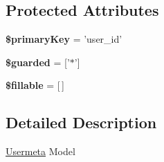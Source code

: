 \subsection*{Protected Attributes}
\begin{DoxyCompactItemize}
\item 
\hypertarget{classDMA_1_1Friends_1_1Models_1_1Usermeta_a664f37df5630b8a17b65b5d95192780b}{{\bfseries \$primary\+Key} = 'user\+\_\+id'}\label{classDMA_1_1Friends_1_1Models_1_1Usermeta_a664f37df5630b8a17b65b5d95192780b}

\item 
\hypertarget{classDMA_1_1Friends_1_1Models_1_1Usermeta_a95d74f02cd302db9566b8da29154e82d}{{\bfseries \$guarded} = \mbox{[}'$\ast$'\mbox{]}}\label{classDMA_1_1Friends_1_1Models_1_1Usermeta_a95d74f02cd302db9566b8da29154e82d}

\item 
\hypertarget{classDMA_1_1Friends_1_1Models_1_1Usermeta_a1dca0217848634cab6e2ad205804e351}{{\bfseries \$fillable} = \mbox{[}$\,$\mbox{]}}\label{classDMA_1_1Friends_1_1Models_1_1Usermeta_a1dca0217848634cab6e2ad205804e351}

\end{DoxyCompactItemize}


\subsection{Detailed Description}
\hyperlink{classDMA_1_1Friends_1_1Models_1_1Usermeta}{Usermeta} Model 

